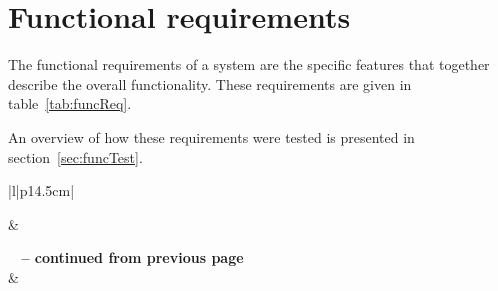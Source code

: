 \newpage
\section{Functional requirements}
\label{sec:functionalReq}
The functional requirements of a system are the specific features that together describe the overall functionality. These requirements are given in table~\ref{tab:funcReq}.

An overview of how these requirements were tested is presented in section~\ref{sec:funcTest}.

\begin{longtable}{|l|p{14.5cm}|}

\hline
{} &  \\
\endfirsthead


%
{{\bfseries \tablename\ \thetable{} -- continued from previous page}} \\\hline
{} &  \\
\endhead

 \\ \hline
\endfoot
 
\endlastfoot


\end{longtable}
